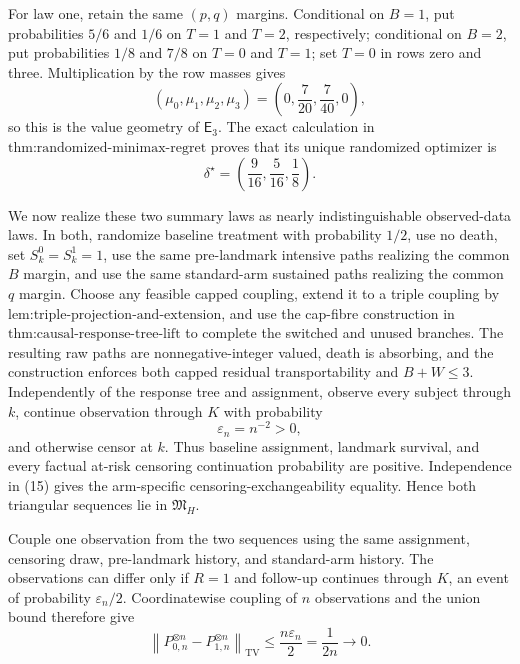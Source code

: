For law one, retain the same \((p,q)\) margins.  Conditional on \(B=1\), put probabilities \(5/6\) and \(1/6\) on \(T=1\) and \(T=2\), respectively; conditional on \(B=2\), put probabilities \(1/8\) and \(7/8\) on \(T=0\) and \(T=1\); set \(T=0\) in rows zero and three.  Multiplication by the row masses gives
\[
 (\mu_0,\mu_1,\mu_2,\mu_3)
 =\left(0,\frac7{20},\frac7{40},0\right),               \tag{13}
\]
so this is the value geometry of \(\mathsf E_3\).  The exact calculation in \(\text{thm:randomized-minimax-regret}\) proves that its unique randomized optimizer is
\[
 \delta^\star=\left(\frac9{16},\frac5{16},\frac18\right). \tag{14}
\]

We now realize these two summary laws as nearly indistinguishable observed-data laws.  In both, randomize baseline treatment with probability \(1/2\), use no death, set \(S_k^0=S_k^1=1\), use the same pre-landmark intensive paths realizing the common \(B\) margin, and use the same standard-arm sustained paths realizing the common \(q\) margin.  Choose any feasible capped coupling, extend it to a triple coupling by \(\text{lem:triple-projection-and-extension}\), and use the cap-fibre construction in \(\text{thm:causal-response-tree-lift}\) to complete the switched and unused branches.  The resulting raw paths are nonnegative-integer valued, death is absorbing, and the construction enforces both capped residual transportability and \(B+W\le3\).  Independently of the response tree and assignment, observe every subject through \(k\), continue observation through \(K\) with probability
\[
 \varepsilon_n=n^{-2}>0,                                \tag{15}
\]
and otherwise censor at \(k\).  Thus baseline assignment, landmark survival, and every factual at-risk censoring continuation probability are positive.  Independence in (15) gives the arm-specific censoring-exchangeability equality.  Hence both triangular sequences lie in \(\mathfrak M_H\).

Couple one observation from the two sequences using the same assignment, censoring draw, pre-landmark history, and standard-arm history.  The observations can differ only if \(R=1\) and follow-up continues through \(K\), an event of probability \(\varepsilon_n/2\).  Coordinatewise coupling of \(n\) observations and the union bound therefore give
\[
 \left\|P_{0,n}^{\otimes n}-P_{1,n}^{\otimes n}\right\|_{\mathrm{TV}}
 \le \frac{n\varepsilon_n}{2}
 =\frac1{2n}\longrightarrow0.                           \tag{16}
\]


